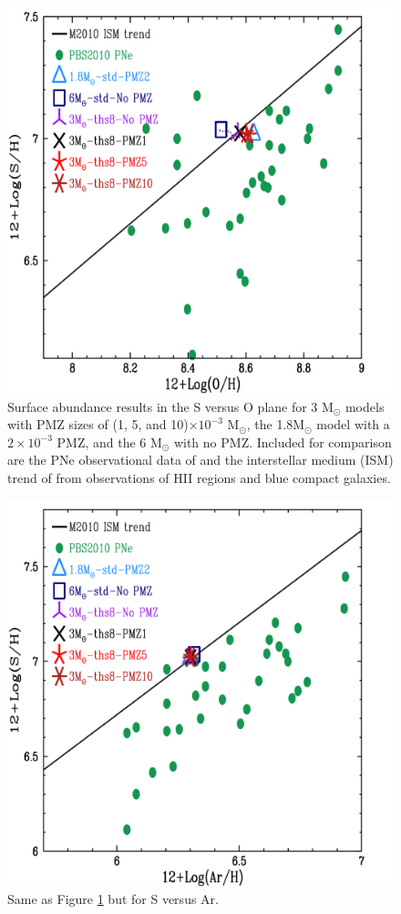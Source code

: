 \begin{figure}
 \begin{center}\includegraphics[width=\columnwidth,height=0.75\columnwidth]{figures/surfresults-SvsO.pdf}\end{center}
 \caption{Surface abundance results in the S versus O plane for 3 M$_\odot$ models with PMZ sizes of (1, 5, and 10)$\times 10^{-3}$ M$_\odot$, the 1.8M$_\odot$ model with a $2\times10^{-3}$ PMZ, and the 6 M$_\odot$ with no PMZ. Included for comparison are the PNe observational data of \citet{Pottasch:2010jt} and the interstellar medium (ISM) trend of \citet{Milingo:2010er} from observations of HII regions and blue compact galaxies.}\label{fig:surfresults-svso}
\end{figure}

\begin{figure}
 \begin{center}\includegraphics[width=\columnwidth,height=0.75\columnwidth]{figures/surfresults-SvsAr.pdf}\end{center}
 \caption{Same as Figure \ref{fig:surfresults-svso} but for S versus Ar.}\label{fig:surfresults-svsar}
\end{figure}

